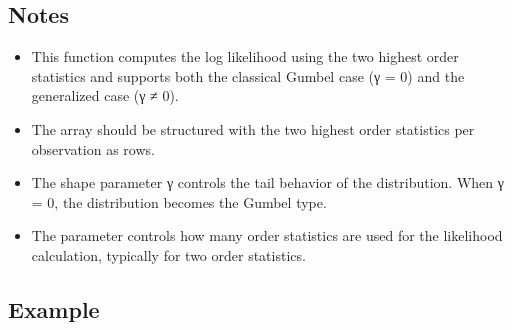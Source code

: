 \documentclass[a4paper,11pt,openany,english]{sphinxmanual}
\begin{document}
\begin{fulllineitems}
\begin{description}
\end{description}


\subsection{Notes}
\label{\detokenize{api_topt:id84}}\begin{itemize}
\item {} 
\sphinxAtStartPar
This function computes the log likelihood using the two highest order statistics and supports both the classical 
Gumbel case (γ = 0) and the generalized case (γ ≠ 0).

\item {} 
\sphinxAtStartPar
The  array should be structured with the two highest order statistics per observation as rows.

\item {} 
\sphinxAtStartPar
The shape parameter γ controls the tail behavior of the distribution. When γ = 0, the distribution becomes the Gumbel type.

\item {} 
\sphinxAtStartPar
The  parameter controls how many order statistics are used for the likelihood calculation, typically  for two order statistics.

\end{itemize}


\subsection{Example}
\label{\detokenize{api_topt:id85}}
\begin{sphinxVerbatim}[commandchars=\\\{\}]
  \PYG{p}{[}\PYG{p}{[} \PYG{p}{]} \PYG{p}{[} \PYG{p}{]} \PYG{p}{[} \PYG{p}{]} \PYG{p}{[} \PYG{p}{]}\PYG{p}{]}
    
\end{sphinxVerbatim}

\end{fulllineitems}
\end{document}
